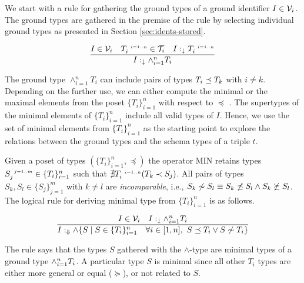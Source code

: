 \documentclass[runningheads]{llncs}
\newcommand{\s}{\scriptscriptstyle\ \,}
\newcommand{\darr}{\downarrow}
\newcommand{\Darr}{\Downarrow}
\newcommand{\V}{{\cal V}}
\newcommand{\T}{{\cal T}}
\newcommand{\memo}[1]{}
\begin{document}
We start with a rule for gathering the ground types of a ground
identifier $I\in\V_i$. The ground types are gathered in the premise of
the rule by selecting individual ground types as presented in Section
\ref{sec:idents-stored}.

\begin{equation}
\label{rul:land-1}
\dfrac{I\in\V_i\quad\/T_i^{\s\/i=1..n}\in\T_i\quad\/I:_{\darr}T_i^{\s\/i=1..n}}
      {I:_{\darr}\land_{i=1}^n\/T_i}
\end{equation}

\memo{
Let's have a look at $\land$-type composed of $I$'s ground types
$T_i^{\s\/i=1..n}$ in the case $I\in\V_i$. In Yago \cite{Hoffart2013},
often $I$ has a set of very specific classes $T_s$ but also some
general classes $C_g$. The general classes $C_g$ are close to the
classes used in the schema triple types. If stored typing of $V$ is
correct, then $C_g$ includes the classes that are supertypes of
classes from $C_s$.}

The ground type $\land_{i=1}^nT_i$ can include pairs of types
$T_i\preceq\/T_k$ with $i\not=k$. Depending on the further use, we can
either compute the minimal or the maximal elements from the poset
$\{T_i\}_{i=1}^n$  with respect to $\preceq$
\cite{DaveyPriestley2002}. The supertypes of the minimal elements of
$\{T_i\}_{i=1}^n$ include all valid types of $I$. Hence, we use
the set of minimal elements from $\{T_i\}_{i=1}^n$ as the starting
point to explore the relations between the ground types and the
schema types of a triple $t$.

Given a poset of types $(\{T_i\}_{i=1}^n,\preceq)$ the operator MIN
retains types $S_j^{\s\/j=1..m}\in\{T_i\}_{i=1}^n$ such that
${\nexists}\/T_i^{\s\/i=1..n}(T_k\prec\/S_j)$. All pairs of types
$S_k,S_l\in\{S_j\}_{j=1}^m$ with $k\not=l$ are \emph{incomparable},
i.e.,
$S_k\not\sim\/S_l\equiv\/S_k\not\preceq\/S_l\land\/S_k\not\succeq\/S_l$.
The logical rule for deriving minimal type from $\{T_i\}_{i=1}^n$ is
as follows.

\begin{equation}
\label{rul:min}
\dfrac{I\in\V_i\quad\/I:_\darr\land_{i=1}^n\/T_i}
      {I:_{\Darr}\land \{S \mid S\in\/\{T_i\}_{i=1}^n\quad\forall\/i\in[1,n],\ S\preceq\/T_i\lor\/S\not\sim\/T_i\}}
\end{equation}

The rule says that the types $S$ gathered with the $\land$-type are
minimal types of a ground type $\land_{i=1}^n\/T_i$. A particular type
$S$ is minimal since all other $T_i$ types are either more general or
equal ($\succeq$), or not related to $S$. 
\end{document}
